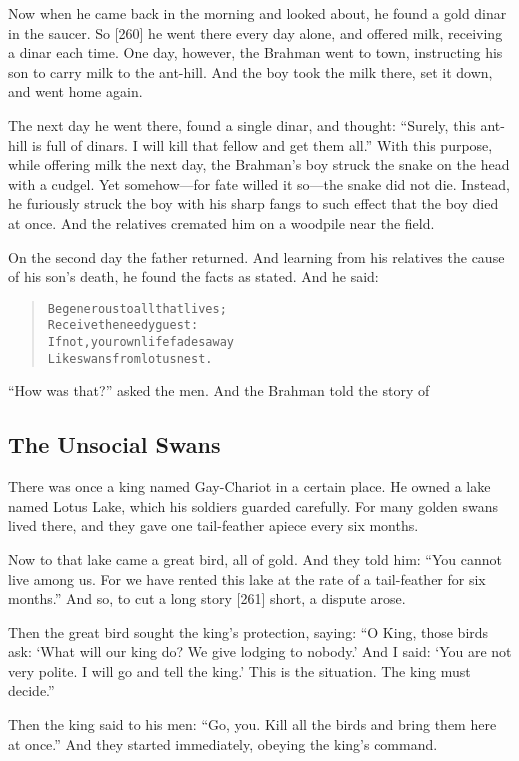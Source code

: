 \documentclass[article, twoside, 14pt]{memoir}
\renewenvironment{verbatim}{%
\begin{quote}%
\vskip -10pt%
\begin{alltt}\normalfont\large}{\end{alltt}%
\end{quote}%
\vskip -10pt
} %
\begin{document}
Now when he came back in the morning and looked about, he found a
gold dinar in the saucer. So [260] he went there every day alone,
and offered milk, receiving a dinar each time. One day, however,
the Brahman went to town, instructing his son to carry milk to the
ant-hill. And the boy took the milk there, set it down, and went
home again.

The next day he went there, found a single dinar, and thought:
``Surely, this ant-hill is full of dinars. I will kill that fellow and get them all.''
With this purpose, while offering milk the next day, the Brahman's
boy struck the snake on the head with a cudgel. Yet somehow---for
fate willed it so---the snake did not die. Instead, he furiously
struck the boy with his sharp fangs to such effect that the boy
died at once. And the relatives cremated him on a woodpile near the
field.

On the second day the father returned. And learning from his
relatives the cause of his son's death, he found the facts as
stated. And he said:

\begin{verbatim}
Be generous to all that lives;
    Receive the needy guest:
If not, your own life fades away
    Like swans from lotus nest.
\end{verbatim}
``How was that?'' asked the men. And the Brahman told the story of

\subsection{The Unsocial Swans}

\label{s54}

There was once a king named Gay-Chariot in a certain place. He
owned a lake named Lotus Lake, which his soldiers guarded
carefully. For many golden swans lived there, and they gave one
tail-feather apiece every six months.

Now to that lake came a great bird, all of gold. And they told him:
``You cannot live among us. For we have rented this lake at the rate of a tail-feather for six months.''
And so, to cut a long story [261] short, a dispute arose.

Then the great bird sought the king's protection, saying:
``O King, those birds ask: `What will our king do? We give lodging to nobody.' And I said: `You are not very polite. I will go and tell the king.' This is the situation. The king must decide.''

Then the king said to his men:
``Go, you. Kill all the birds and bring them here at once.'' And
they started immediately, obeying the king's command.
\end{document}
